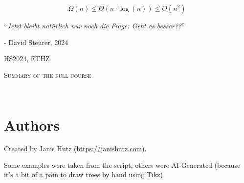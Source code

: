 \documentclass{article}
\begin{document}
\startDocument
\usetcolorboxes


\vspace{3cm}

\begin{Huge}
    \[
        \Omega(n) \leq \Theta(n \cdot \log(n)) \leq O(n^2)
    \]
\end{Huge}

\vspace{6cm}
\begin{center}
    \begin{Large}
        ``\textit{Jetzt bleibt natürlich nur noch die Frage: Geht es besser??}''
    \end{Large}

    \hspace{4cm} - David Steurer, 2024
\end{center}

\vspace{2cm}
\begin{center}
    HS2024, ETHZ\\[0.2cm]
    \begin{Large}
        \textsc{Summary of the full course}
    \end{Large}\\[0.2cm]
\end{center}


\newpage




























\newpage
\section{Authors}
Created by Janis Hutz (\url{https://janishutz.com}).

Some examples were taken from the script, others were AI-Generated (because it's a bit of a pain to draw trees by hand using Tikz)
\end{document}
